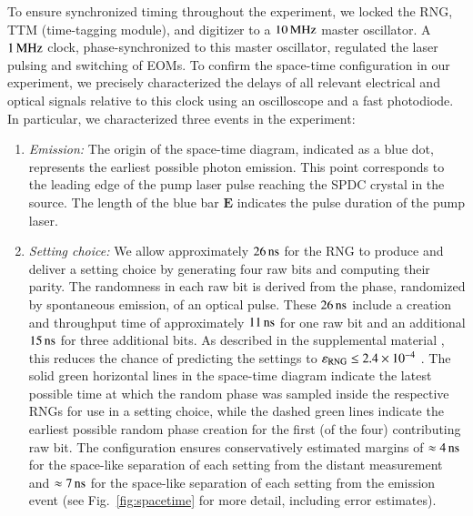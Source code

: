 \documentclass[superscriptaddress,twocolumn]{revtex4-1}
\begin{document}
To ensure synchronized timing throughout the experiment, we locked the RNG, TTM (time-tagging module), and digitizer to a $\unit[10]{MHz}$ master oscillator. A $\unit[1]{MHz}$ clock, phase-synchronized to this master oscillator, regulated the laser pulsing and switching of EOMs. To confirm the space-time configuration in our experiment, we precisely characterized the delays of all relevant electrical and optical signals relative to this clock using an oscilloscope and a fast photodiode. In particular, we characterized three events in the experiment:
\begin{enumerate}

 \item \emph{Emission:} The origin of the space-time diagram, indicated as a blue dot, represents the earliest possible photon emission. This point corresponds to the leading edge of the pump laser pulse reaching the SPDC crystal in the source. The length of the blue bar $\textbf{E}$ indicates the pulse duration of the pump laser. 

\item \emph{Setting choice:} We allow approximately $\unit[26]{ns}$ for the RNG to produce and deliver a setting choice by generating four raw bits and computing their parity. The randomness in each raw bit is derived from the phase, randomized by spontaneous emission, of an optical pulse. These $\unit[26]{ns}$ include a creation and throughput time of approximately $\unit[11]{ns}$ for one raw bit and an additional $\unit[15]{ns}$ for three additional bits. As described in the supplemental material \cite{supplemental_material} \nocite{RukhinNIST2010,LEcuyerACM2007,Cabrera1998,Lita2010,GiustinaDiss,Bednorz2015}, this reduces the chance of predicting the settings to $\varepsilon_{\rm RNG} \leq 2.4 \times 10^{-4}$ \cite{Abellan2014,Abellan2015}. The solid green horizontal lines in the space-time diagram indicate the latest possible time at which the random phase was sampled inside the respective RNGs for use in a setting choice, while the dashed green lines indicate the earliest possible random phase creation for the first (of the four) contributing raw bit. The configuration ensures conservatively estimated margins of $\approx\unit[4]{ns}$ for the space-like separation of each setting from the distant measurement and $\approx\unit[7]{ns}$ for the space-like separation of each setting from the emission event (see Fig.~\ref{fig:spacetime} for more detail, including error estimates).


\end{enumerate}
\end{document}
